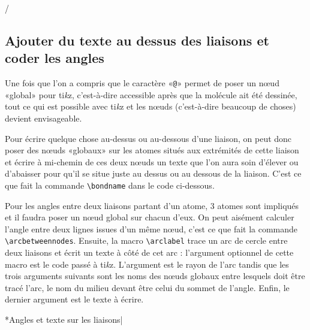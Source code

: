 \documentclass[10pt,french]{article}
\makeatletter
\newcommand\make@car@active[1]{%
	\catcode`#1\active
	\begingroup
		\lccode`\~`#1\relax
		\lowercase{\endgroup\def~}%
}
\newif\if@exstar
\newcommand\exemple{%
	\begingroup
	\parskip\z@
	\@makeother\;\@makeother\!\@makeother\?\@makeother\:%
	\@ifstar{\@exstartrue\exemple@}{\@exstarfalse\exemple@}}
\newcommand\exemple@[2][65]{%
	\medbreak\noindent
	\begingroup
		\let\do\@makeother\dospecials
		\make@car@active\ { {}}%
		\make@car@active\^^M{\par\leavevmode}%
		\make@car@active\^^I{\space\space}%
		\make@car@active\,{\leavevmode\kern\z@\string,}%
		\make@car@active\-{\leavevmode\kern\z@\string-}%
		\make@car@active\>{\leavevmode\kern\z@\string>}%
		\make@car@active\<{\leavevmode\kern\z@\string<}%
		\exemple@@{#1}{#2}%
}
\newcommand\exemple@@[3]{%
	\def\@tempa##1#3{\exemple@@@{#1}{#2}{##1}}%
	\@tempa
}
\newcommand\exemple@@@[3]{%
	\xdef\the@code{#3}%
	\endgroup
	\if@exstar
		\begingroup
			\fboxrule0.4pt
			\let\breakboxparindent\z@
			\def\bkvz@bottom{\hrule\@height\fboxrule}%
			\let\bkvz@before@breakbox\relax
			\def\bkvz@set@linewidth{\advance\linewidth\dimexpr-2\fboxrule-2\fboxsep}%
			\def\bkvz@left{\vrule\@width\fboxrule\hskip\fboxsep}%
			\def\bkvz@right{\hskip\fboxsep\vrule\@width\fboxrule}%
			\def\bkvz@top{\hbox to \hsize{%
				\vrule\@width\fboxrule\@height\fboxrule
				\leaders\bkvz@bottom\hfill
				\sffamily
				\fboxsep\z@
				\colorbox{black}{\kern0.25em\color{white}\footnotesize\lower0.5ex\hbox{\strut#2}\kern0.25em}%
				\leaders\bkvz@bottom\hfill
				\vrule\@width\fboxrule\@height\fboxrule}}%
			\breakbox
				\kern.5ex\relax
				\ttfamily\footnotesize\the@code\par
				\normalfont
				\kern3pt
				\hrule height0.1pt width\linewidth depth0.1pt
				\vskip5pt
				\rightskip0pt plus 1fill
				\everypar{{\color{lightgray}\rlap{\vrule height0.1pt width\linewidth depth0.1pt}}\hskip0pt plus 1fill}%
				\newlinechar`\^^M\everyeof{\noexpand}\scantokens{#3}\par
			\endbreakbox
		\endgroup
	\else
		\vskip0.5ex
		\boxput*(0,1)
			{\fboxsep\z@
			\hbox{\sffamily\colorbox{black}{\leavevmode\kern0.25em{\color{white}\footnotesize\strut#2}\kern0.25em}}%
			}%
			{\fboxsep5pt
			\fbox{%
				$\vcenter{\hsize\dimexpr0.#1\linewidth-\fboxsep-\fboxrule\relax
					\kern5pt\parskip0pt \ttfamily\footnotesize\the@code}%
				\vcenter{\kern5pt\hsize\dimexpr\linewidth-0.#1\linewidth-\fboxsep-\fboxrule\relax
					\everypar{{\color{lightgray}\rlap{\vrule height0.1pt width\dimexpr\linewidth-0.#1\linewidth-\fboxsep-\fboxrule depth0.1pt}}}%
					\footnotesize\newlinechar`\^^M\everyeof{\noexpand}\scantokens{#3}}$%
				}%
			}%
	\fi
	\medbreak
	\endgroup
}
\let\do\@makeother\dospecials
\newcommand\TIKZ{ti\textit kz\xspace}
\makeatother
\begin{document}
\hflipnext%
/

\subsection{Ajouter du texte au dessus des liaisons et coder les angles}
Une fois que l'on a compris que le caractère «\verb-@-» permet de poser un nœud «global» pour \TIKZ, c'est-à-dire accessible après que la molécule ait été dessinée, tout ce qui est possible avec \TIKZ et les nœuds (c'est-à-dire beaucoup de choses) devient envisageable.

Pour écrire quelque chose au-dessus ou au-dessous d'une liaison, on peut donc poser des nœuds «globaux» sur les atomes situés aux extrémités de cette liaison et écrire à mi-chemin de ces deux nœuds un texte que l'on aura soin d'élever ou d'abaisser pour qu'il se situe juste au dessus ou au dessous de la liaison. C'est ce que fait la commande \verb-\bondname- dans le code ci-dessous.

Pour les angles entre deux liaisons partant d'un atome, 3 atomes sont impliqués et il faudra poser un nœud global sur chacun d'eux. On peut aisément calculer l'angle entre deux lignes issues d'un même nœud, c'est ce que fait la commande \verb-\arcbetweennodes-. Ensuite, la macro \verb-\arclabel- trace un arc de cercle entre deux liaisons et écrit un texte à côté de cet arc : l'argument optionnel de cette macro est le code passé à \TIKZ. L'argument  est le rayon de l'arc tandis que les trois arguments suivants sont les noms des nœuds globaux entre lesquels doit être tracé l'arc, le nom du milieu devant être celui du sommet de l'angle. Enfin, le dernier argument est le texte à écrire.

\exemple*{Angles et texte sur les liaisons}|\newcommand\angstrom{\mbox{\normalfont\AA}}
\newcommand\namebond[4][5pt]{\chemmove{\path(#2)--(#3)node[midway,sloped,yshift=#1]{#4};}}

\newcommand\arcbetweennodes[3]{%
  \pgfmathanglebetweenpoints{\pgfpointanchor{#1}{center}}{\pgfpointanchor{#2}{center}}%
  \let#3\pgfmathresult}

\newcommand\arclabel[6][stealth-stealth,shorten <=1pt,shorten >=1pt]{%
  \chemmove{%
    \arcbetweennodes{#4}{#3}\anglestart \arcbetweennodes{#4}{#5}\angleend
    \draw[#1]([shift=(\anglestart:#2)]#4)arc(\anglestart:\angleend:#2);
    \pgfmathparse{(\anglestart+\angleend)/2}\let\anglestart\pgfmathresult
    \node[shift=(\anglestart:#2+1pt)#4,anchor=\anglestart+180,rotate=\anglestart+90,inner sep=0pt,
          outer sep=0pt]at(#4){#6};}}
\end{document}
